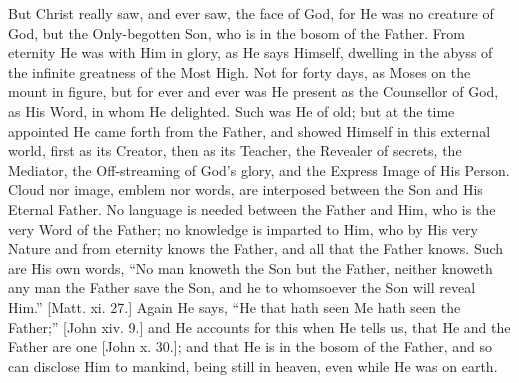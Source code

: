 But Christ really saw, and ever saw, the face of God, for He was no
creature of God, but the Only-begotten Son, who is in the bosom of the
Father. From eternity He was with Him in glory, as He says Himself,
dwelling in the abyss of the infinite greatness of the Most High. Not
for forty days, as Moses on the mount in figure, but for ever and ever
was He present as the Counsellor of God, as His Word, in whom He
delighted. Such was He of old; but at the time appointed He came forth
from the Father, and showed Himself in this external world, first as
its Creator, then as its Teacher, the Revealer of secrets, the
Mediator, the Off-streaming of God's glory, and the Express Image of
His Person. Cloud nor image, emblem nor words, are interposed between
the Son and His Eternal Father. No language is needed between the
Father and Him, who is the very Word of the Father; no knowledge is
imparted to Him, who by His very Nature and from eternity knows the
Father, and all that the Father knows. Such are His own words,
``No man knoweth the Son but the Father, neither knoweth any man
the Father save the Son, and he to whomsoever the Son will reveal
Him.'' [Matt. xi. 27.] Again He says, ``He that hath seen Me
hath seen the Father;'' [John xiv. 9.] and He accounts for this
when He tells us, that He and the Father are one [John x. 30.]; and
that He is in the bosom of the Father, and so can disclose Him to
mankind, being still in heaven, even while He was on earth.

